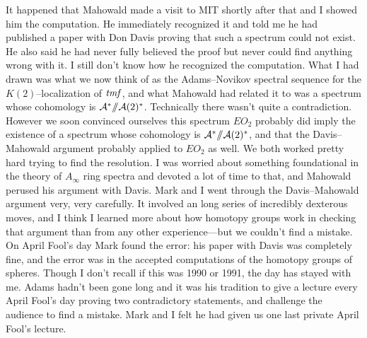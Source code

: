 It happened that Mahowald made a visit to MIT shortly after that and I
showed him the computation.  He immediately recognized it and told me
he had published a paper with Don Davis proving that such a spectrum
could not exist.  He also said he had never fully believed the proof
but never could find anything wrong with it.  I still don't know how
he recognized the computation.  What I had drawn was what we now think
of as the Adams--Novikov spectral sequence for the $K(2)$--localization
of $\mathit{tmf}$, and what Mahowald had related it to was a spectrum whose
cohomology is $\mathcal A^* /\!\!/ \mathcal A(2)^*$.
Technically there wasn't quite a contradiction.  However
we soon convinced ourselves this spectrum $EO_{2}$ probably did imply
the existence of a spectrum whose cohomology is $\mathcal A^* /\!\!/ \mathcal A(2)^*$,
and that the
Davis--Mahowald argument probably applied to $EO_{2}$ as well.  We both
worked pretty hard trying to find the resolution.  I was worried about
something foundational in the theory of $A_{\infty}$ ring spectra and
devoted a lot of time to that, and Mahowald perused his argument with
Davis.  Mark and I went through the Davis--Mahowald argument very, very
carefully.  It involved an long series of incredibly dexterous moves,
and I think I learned more about how homotopy groups work in
checking that argument than from any other experience---but we
couldn't find a mistake.  On April Fool's day Mark found the
error: his paper with Davis was completely fine, and the error was in
the accepted computations of the homotopy groups of spheres.  Though I
don't recall if this was 1990 or 1991, the day has stayed with me.
Adams hadn't been gone long and it was his tradition to give a lecture
every April Fool's day proving two contradictory statements, and
challenge the audience to find a mistake.  Mark and I felt he had
given us one last private April Fool's lecture.

